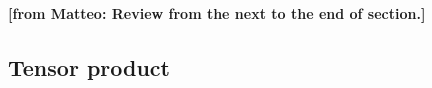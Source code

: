 \documentclass[a4paper,10pt]{article}
\newcommand{\from}[2]{{\bf[{\sc from #1:} #2]}}
\begin{document}








\from{Matteo}{Review from the next to the end of section.}

\subsection{Tensor product}
\end{document}
